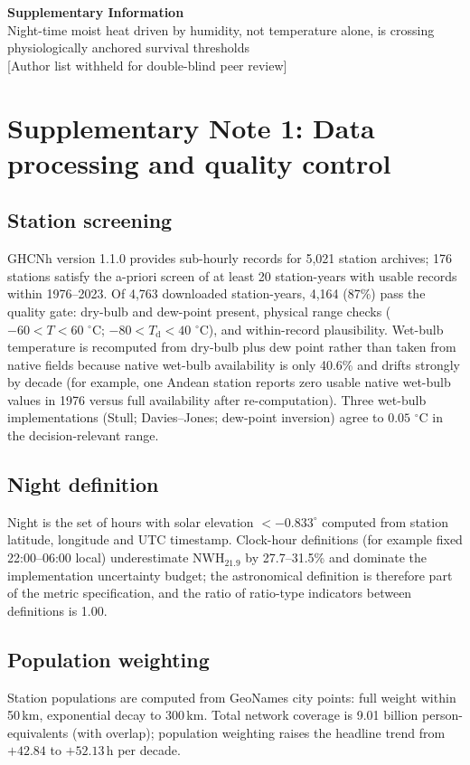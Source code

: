 \documentclass[12pt,a4paper]{article}
\newcommand{\dd}{\ensuremath{\,^{\circ}\mathrm{C}}}
\begin{document}
\begin{center}
{\LARGE\bfseries Supplementary Information}\\[6pt]
{\large Night-time moist heat driven by humidity, not temperature alone, is crossing
physiologically anchored survival thresholds}\\[4pt]
{\small [Author list withheld for double-blind peer review]}
\end{center}

\section*{Supplementary Note 1: Data processing and quality control}
\subsection*{Station screening}
GHCNh version 1.1.0 provides sub-hourly records for 5,021 station archives; 176 stations satisfy
the a-priori screen of at least 20 station-years with usable records within 1976--2023. Of 4,763
downloaded station-years, 4,164 (87\%) pass the quality gate: dry-bulb and dew-point present,
physical range checks ($-60<T<60$\,\dd{}; $-80<T_\mathrm{d}<40$\,\dd{}), and within-record
plausibility. Wet-bulb temperature is recomputed from dry-bulb plus dew point rather than taken
from native fields because native wet-bulb availability is only 40.6\% and drifts strongly by
decade (for example, one Andean station reports zero usable native wet-bulb values in 1976 versus
full availability after re-computation). Three wet-bulb implementations (Stull; Davies--Jones;
dew-point inversion) agree to $0.05\,\dd$ in the decision-relevant range.

\subsection*{Night definition}
Night is the set of hours with solar elevation $<-0.833^\circ$ computed from station latitude,
longitude and UTC timestamp. Clock-hour definitions (for example fixed 22:00--06:00 local)
underestimate $\mathrm{NWH}_{21.9}$ by 27.7--31.5\% and dominate the implementation uncertainty
budget; the astronomical definition is therefore part of the metric specification, and the ratio
of ratio-type indicators between definitions is 1.00.

\subsection*{Population weighting}
Station populations are computed from GeoNames city points: full weight within 50\,km, exponential
decay to 300\,km. Total network coverage is 9.01 billion person-equivalents (with overlap);
population weighting raises the headline trend from $+42.84$ to $+52.13$\,h per decade.
\end{document}
